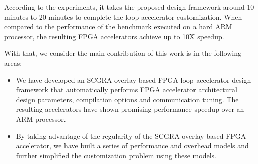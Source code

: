 According to the experiments, it takes the proposed design framework around 10 minutes
to 20 minutes to complete the loop accelerator customization. When compared to the performance of
the benchmark executed on a hard ARM processor, the resulting FPGA accelerators achieve up to 10X speedup.  

With that, we consider the main contribution of this work is in the following areas:
\begin{itemize}[nosep]
\item We have developed an SCGRA overlay based FPGA loop accelerator design framework that 
    automatically performs FPGA accelerator architectural design parameters, compilation options and
    communication tuning. The resulting accelerators have shown promising performance speedup over
    an ARM processor.
\item By taking advantage of the regularity of the SCGRA overlay based FPGA accelerator, we have
    built a series of performance and overhead models and further simplified the customization
    problem using these models.
\end{itemize}



